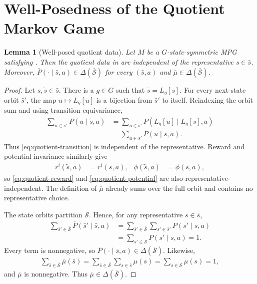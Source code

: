 \documentclass{article}
\theoremstyle{plain}
\newtheorem{lemma}[theorem]{Lemma}
\theoremstyle{definition}
\theoremstyle{remark}
\newcommand{\St}{\mathcal{S}}
\newcommand{\quotient}[1]{\overline{#1}}
\begin{document}
\section{Well-Posedness of the Quotient Markov Game}
\label{app:proof-quotient-well-posed}

\begin{lemma}[Well-posed quotient data]
\label{lemma:quotient-well-posed}
Let $M$ be a $G$-state-symmetric MPG satisfying .
Then the quotient data in  are independent of the
representative $s\in\bar s$. Moreover,
$\quotient P(\cdot\mid\bar s,a)\in\Delta(\quotient\St)$ for every
$(\bar s,a)$ and $\quotient\mu\in\Delta(\quotient\St)$.
\end{lemma}

\begin{proof}
Let $s,\widetilde s\in\bar s$. There is a $g\in G$ such that
$\widetilde s=L_g[s]$. For every next-state orbit $\bar s'$, the map
$u\mapsto L_g[u]$ is a bijection from $\bar s'$ to itself. Reindexing the orbit
sum and using transition equivariance,
\begin{align*}
  \sum_{u\in\bar s'}P(u\mid\widetilde s,a)
  &=
  \sum_{u\in\bar s'}P(L_g[u]\mid L_g[s],a)\\
  &=
  \sum_{u\in\bar s'}P(u\mid s,a).
\end{align*}
Thus \eqref{eq:quotient-transition} is independent of the representative.
Reward and potential invariance similarly give
\begin{align*}
  r^i(\widetilde s,a)
  &=
  r^i(s,a),&
  \phi(\widetilde s,a)
  &=
  \phi(s,a),
\end{align*}
so \eqref{eq:quotient-reward} and \eqref{eq:quotient-potential} are also
representative-independent. The definition of $\quotient\mu$ already sums over
the full orbit and contains no representative choice.

The state orbits partition $\St$. Hence, for any representative $s\in\bar s$,
\begin{align*}
  \sum_{\bar s'\in\quotient\St}
  \quotient P(\bar s'\mid\bar s,a)
  &=
  \sum_{\bar s'\in\quotient\St}
  \sum_{s'\in\bar s'}P(s'\mid s,a)\\
  &=
  \sum_{s'\in\St}P(s'\mid s,a)
  =
  1.
\end{align*}
Every term is nonnegative, so
$\quotient P(\cdot\mid\bar s,a)\in\Delta(\quotient\St)$. Likewise,
\begin{align*}
  \sum_{\bar s\in\quotient\St}\quotient\mu(\bar s)
  =
  \sum_{\bar s\in\quotient\St}\sum_{s\in\bar s}\mu(s)
  =
  \sum_{s\in\St}\mu(s)
  =
  1,
\end{align*}
and $\quotient\mu$ is nonnegative. Thus $\quotient\mu\in\Delta(\quotient\St)$.
\end{proof}
\end{document}
